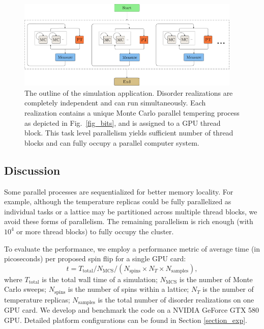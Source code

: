 \begin{figure}[ht]
  \centering
  \includegraphics[width=0.95\textwidth] {img/skeleton1_.pdf}
  \caption{The outline of the simulation application. Disorder realizations are completely 
independent and can run simultaneously. Each realization contains a unique 
Monte Carlo parallel tempering process as depicted in Fig.~\ref{fig_bits}, and is 
assigned to a GPU thread block. This task level parallelism yields sufficient number of  
thread blocks and can fully occupy a parallel computer system.
}
  \label{fig_tasks}
\end{figure}
 



\subsection{Discussion}

Some parallel processes are sequentialized for better memory
locality. For example, although the temperature replicas could be
fully parallelized as individual tasks or a lattice may be partitioned
across multiple thread blocks, we avoid these forms of parallelism.
The remaining parallelism is rich enough (with $10^4$ or more 
thread blocks) to fully occupy the cluster. %


To evaluate %
the performance, we employ a performance metric of
average time (in picoseconds) per proposed spin flip for a single GPU card:
\begin{equation}
  \label{eq:tsf}
  t=T_\mathrm{total} / N_\mathrm{MCS} / \left( N_\mathrm{spins} \times N_T \times N_\mathrm{samples} \right),
\end{equation}
where $T_\mathrm{total}$ is the total wall time of a simulation;
$N_\mathrm{MCS}$ is the number of Monte Carlo sweeps;
$N_\mathrm{spins}$ is the number of spins within a lattice;
$N_T$ is the number of temperature replicas;
$N_\mathrm{samples}$ is the total number of disorder realizations on one GPU card.
We develop and benchmark the code on a NVIDIA GeForce GTX 580 GPU. Detailed
platform configurations can be found in Section \ref{section_exp}.




